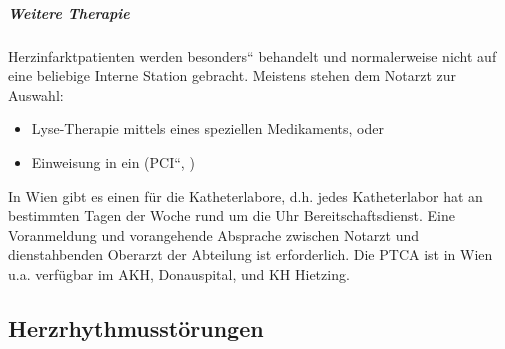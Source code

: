 \subparagraph{Weitere Therapie}

Herzinfarktpatienten werden {\quotedblbase}besonders{\textquotedblleft}
behandelt und normalerweise nicht auf eine beliebige Interne Station
gebracht\cite{Kalla2006}. Meistens stehen dem Notarzt zur
Auswahl:

\begin{itemize}
	\item Lyse-Therapie mittels eines speziellen Medikaments, oder
	\item Einweisung in ein 
	({\quotedblbase}PCI{\textquotedblleft},
	{\quotedblbase}
	)

\end{itemize}

In Wien gibt es einen  für die Katheterlabore, d.h. 
jedes Katheterlabor hat an bestimmten Tagen der Woche rund um die 
Uhr Bereitschaftsdienst. Eine Voranmeldung und vorangehende Absprache 
zwischen Notarzt und dienstahbenden Oberarzt der Abteilung ist erforderlich. 
Die PTCA ist in Wien u.a. verfügbar im AKH, Donauspital, und KH Hietzing.


\subsection{Herzrhythmusstörungen}

